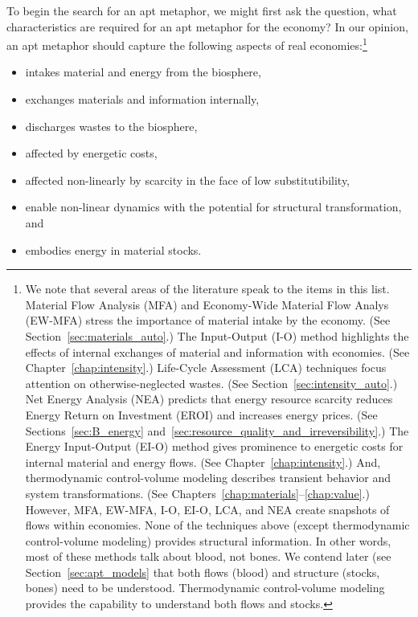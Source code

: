 To begin the search for an apt metaphor, 
we might first ask the question, 
what characteristics are required for an apt metaphor for the economy?
In our opinion, an apt metaphor should capture the following
aspects of real economies:\footnote{We note that 
	several areas of the literature speak to the items in this list.
	Material Flow Analysis (MFA) and 
	Economy-Wide Material Flow Analys (EW-MFA)
	stress the importance of
	material intake by the economy. 
	(See Section~\ref{sec:materials_auto}.)
	The Input-Output (I-O) method highlights the effects of internal exchanges
	of material and information with economies. 
	(See Chapter~\ref{chap:intensity}.)
	Life-Cycle Assessment (LCA) techniques focus attention 
	on otherwise-neglected wastes. 
	(See Section~\ref{sec:intensity_auto}.)
	Net Energy Analysis (NEA) predicts that energy resource 
	scarcity reduces Energy Return on Investment (EROI)
	and increases energy prices.
	(See Sections~\ref{sec:B_energy} and~\ref{sec:resource_quality_and_irreversibility}.)
	The Energy Input-Output (EI-O) method gives prominence to energetic costs
	for internal material and energy flows.
	(See Chapter~\ref{chap:intensity}.)
	And, thermodynamic control-volume modeling describes
	transient behavior and system transformations.
	(See Chapters~\ref{chap:materials}--\ref{chap:value}.)
	However, MFA, EW-MFA, I-O, EI-O, LCA, and NEA create snapshots of flows within economies. 
	None of the techniques above (except thermodynamic control-volume modeling) 
	provides structural information. 
	In other words, most of these methods talk about blood, not bones. 
	We contend later (see Section~\ref{sec:apt_models} that both flows (blood) 
	and structure (stocks, bones) need to be understood.
	Thermodynamic control-volume modeling provides the capability 
	to understand both flows and stocks.
	}

\begin{itemize}
	\item{intakes material and energy from the biosphere,}
	\item{exchanges materials and information internally,}
	\item{discharges wastes to the biosphere,}
	\item{affected by energetic costs,}
	\item{affected non-linearly by scarcity in the face of low substitutibility,}
	\item{enable non-linear dynamics with the potential for structural transformation, and}
	\item{embodies energy in material stocks.}
\end{itemize}

